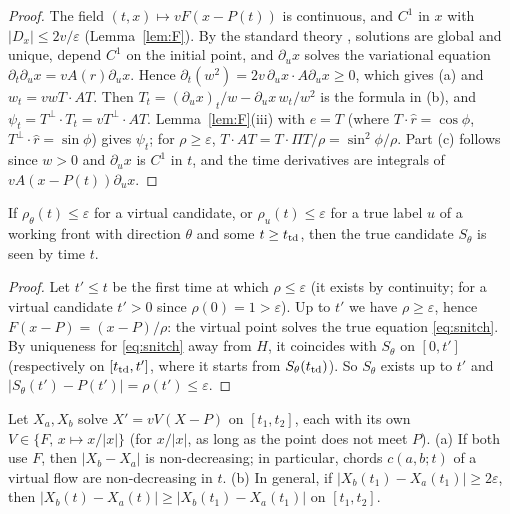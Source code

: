 \begin{proof}
The field $(t,x)\mapsto vF(x-P(t))$ is continuous, and $C^1$ in $x$ with $|D_x|\le2v/\varepsilon$ (Lemma~\ref{lem:F}).
By the standard theory \cite[Ch.~V]{Hartman}, solutions are global and unique, depend $C^1$ on the initial point, and
$\partial_ux$ solves the variational equation $\partial_t\partial_ux=vA(r)\partial_ux$. Hence
$\partial_t(w^2)=2v\,\partial_ux\cdot A\partial_ux\ge0$, which gives (a) and $w_t=vwT\cdot AT$. Then
$T_t=(\partial_ux)_t/w-\partial_ux\,w_t/w^2$ is the formula in (b), and $\psi_t=T^\perp\cdot T_t=vT^\perp\cdot AT$.
Lemma~\ref{lem:F}(iii) with $e=T$ (where $T\cdot\hat r=\cos\phi$, $T^\perp\cdot\hat r=\sin\phi$) gives $\psi_t$; for
$\rho\ge\varepsilon$, $T\cdot AT=T\cdot\Pi T/\rho=\sin^2\phi/\rho$. Part (c) follows since $w>0$ and $\partial_ux$ is
$C^1$ in $t$, and the time derivatives are integrals of $vA(x-P(t))\partial_ux$.
\end{proof}

\begin{lemma}\label{lem:seen}
If $\rho_\theta(t)\le\varepsilon$ for a virtual candidate, or $\rho_u(t)\le\varepsilon$ for a true label $u$ of a working
front with direction $\theta$ and some $t\ge t_{\mathrm{td}}$, then the true candidate $S_\theta$ is seen by time $t$.
\end{lemma}

\begin{proof}
Let $t'\le t$ be the first time at which $\rho\le\varepsilon$ (it exists by continuity; for a virtual candidate $t'>0$
since $\rho(0)=1>\varepsilon$). Up to $t'$ we have $\rho\ge\varepsilon$, hence $F(x-P)=(x-P)/\rho$: the virtual point
solves the true equation \eqref{eq:snitch}. By uniqueness for \eqref{eq:snitch} away from $H$, it coincides with
$S_\theta$ on $[0,t']$ (respectively on $[t_{\mathrm{td}},t']$, where it starts from $S_\theta(t_{\mathrm{td}})$). So $S_\theta$ exists up to
$t'$ and $|S_\theta(t')-P(t')|=\rho(t')\le\varepsilon$.
\end{proof}

\begin{lemma}\label{lem:chords}
Let $X_a,X_b$ solve $X'=vV(X-P)$ on $[t_1,t_2]$, each with its own $V\in\{F,\,x\mapsto x/|x|\}$ \textup(for $x/|x|$,
as long as the point does not meet $P$\textup).
\textup{(a)} If both use $F$, then $|X_b-X_a|$ is non-decreasing; in particular, chords $c(a,b;t)$ of a virtual flow are
non-decreasing in $t$.
\textup{(b)} In general, if $|X_b(t_1)-X_a(t_1)|\ge2\varepsilon$, then $|X_b(t)-X_a(t)|\ge|X_b(t_1)-X_a(t_1)|$ on
$[t_1,t_2]$.
\end{lemma}

